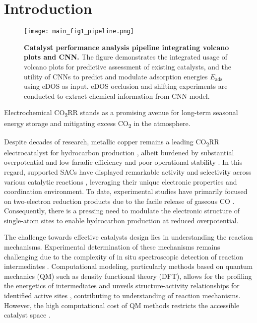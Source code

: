 
\section{Introduction}
\label{main_sec_intro}

\begin{figure}[htbp]
    \centering
    \texttt{[image: main\_fig1\_pipeline.png]}
    \caption{\textbf{Catalyst performance analysis pipeline integrating volcano plots and CNN.}
    The figure demonstrates the integrated usage of volcano plots for
    predictive assessment of existing catalysts, and the utility of CNNs
    to predict and modulate adsorption energies \(E_{\text{ads}}\) using eDOS as input.
    eDOS occlusion and shifting experiments are conducted to extract chemical information from CNN model.}
    \label{main_fig1:pipeline}
\end{figure}

Electrochemical CO\textsubscript{2}RR stands as a promising avenue for long-term
seasonal energy storage \cite{dinh2018co2} and mitigating excess CO\textsubscript{2} in the atmosphere.

Despite decades of research, metallic copper remains a leading CO\textsubscript{2}RR electrocatalyst
for hydrocarbon production \cite{osella2023co2}, albeit burdened by substantial overpotential
and low faradic efficiency and poor operational stability \cite{chen2019identifying, liu2021co2}.
In this regard, supported SACs have displayed remarkable activity and selectivity
across various catalytic reactions \cite{wang2018heterogeneous, yang2018atomically},
leveraging their unique electronic properties and coordination environment.
To date, experimental studies have primarily focused on two-electron reduction products
due to the facile release of gaseous CO \cite{cai2021insights, ju2017understanding, ren2019isolated}.
Consequently, there is a pressing need to modulate the electronic structure of single-atom sites
to enable hydrocarbon production at reduced overpotential.

The challenge towards effective catalysts design lies in understanding the reaction mechanisms.
Experimental determination of these mechanisms remains challenging due to
the complexity of in situ spectroscopic detection of reaction intermediates \cite{zhao2021revisiting}.
Computational modeling, particularly methods based on quantum mechanics (QM) such as density functional theory (DFT),
allows for the profiling the energetics of intermediates and unveils structure-activity relationships
for identified active sites \cite{feaster2017understanding, carter2008challenges},
contributing to understanding of reaction mechanisms.
However, the high computational cost of QM methods restricts the
accessible catalyst space \cite{jinnouchi2017predicting, cuenya2015nanocatalysis, goldsmith2018machine}.

